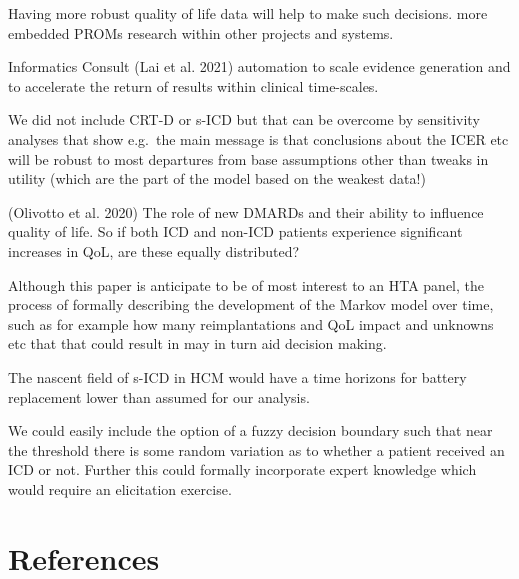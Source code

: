 \documentclass[
]{article}
\begin{document}
Having more robust quality of life data will help to make such
decisions. more embedded PROMs research within other projects and
systems.

Informatics Consult (Lai et al. 2021) automation to scale evidence
generation and to accelerate the return of results within clinical
time-scales.

We did not include CRT-D or s-ICD but that can be overcome by
sensitivity analyses that show e.g.~the main message is that conclusions
about the ICER etc will be robust to most departures from base
assumptions other than tweaks in utility (which are the part of the
model based on the weakest data!)

(Olivotto et al. 2020) The role of new DMARDs and their ability to
influence quality of life. So if both ICD and non-ICD patients
experience significant increases in QoL, are these equally distributed?

Although this paper is anticipate to be of most interest to an HTA
panel, the process of formally describing the development of the Markov
model over time, such as for example how many reimplantations and QoL
impact and unknowns etc that that could result in may in turn aid
decision making.

The nascent field of s-ICD in HCM would have a time horizons for battery
replacement lower than assumed for our analysis.

We could easily include the option of a fuzzy decision boundary such
that near the threshold there is some random variation as to whether a
patient received an ICD or not. Further this could formally incorporate
expert knowledge which would require an elicitation exercise.

\newpage

\hypertarget{references}{%
\section{References}\label{references}}
\end{document}
